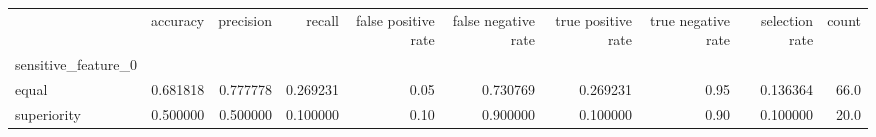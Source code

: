 \begin{tabular}{lrrrrrrrrr}
\toprule
{} &  accuracy &  precision &    recall &  false positive rate &  false negative rate &  true positive rate &  true negative rate &  selection rate &  count \\
sensitive\_feature\_0 &           &            &           &                      &                      &                     &                     &                 &        \\
\midrule
equal               &  0.681818 &   0.777778 &  0.269231 &                 0.05 &             0.730769 &            0.269231 &                0.95 &        0.136364 &   66.0 \\
superiority         &  0.500000 &   0.500000 &  0.100000 &                 0.10 &             0.900000 &            0.100000 &                0.90 &        0.100000 &   20.0 \\
\bottomrule
\end{tabular}
